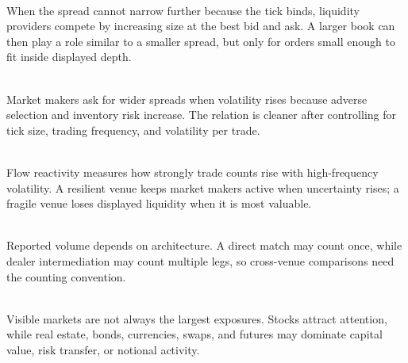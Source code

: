 \begin{principle} \\
When the spread cannot narrow further because the tick binds, liquidity providers compete by increasing size at the best bid and ask. A larger book can then play a role similar to a smaller spread, but only for orders small enough to fit inside displayed depth.
\end{principle}

\begin{mechanism} \\
Market makers ask for wider spreads when volatility rises because adverse selection and inventory risk increase. The relation is cleaner after controlling for tick size, trading frequency, and volatility per trade.
\end{mechanism}

\begin{definition} \\
Flow reactivity measures how strongly trade counts rise with high-frequency volatility. A resilient venue keeps market makers active when uncertainty rises; a fragile venue loses displayed liquidity when it is most valuable.
\end{definition}

\begin{empiricalfinding} \\
Reported volume depends on architecture. A direct match may count once, while dealer intermediation may count multiple legs, so cross-venue comparisons need the counting convention.
\end{empiricalfinding}

\begin{caveat} \\
Visible markets are not always the largest exposures. Stocks attract attention, while real estate, bonds, currencies, swaps, and futures may dominate capital value, risk transfer, or notional activity.
\end{caveat}
